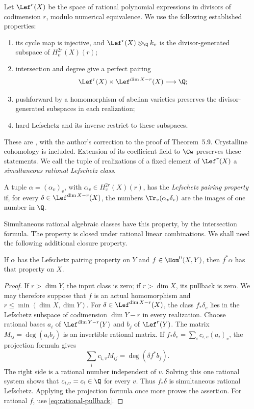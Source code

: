 Let \(\Lef^r(X)\) be the space of rational polynomial expressions in
divisors of codimension \(r\), modulo numerical equivalence. We use the
following established properties:
\begin{enumerate}[label=(\roman*)]
 \item its cycle map is injective, and
 \(\Lef^r(X)\otimes_\Q k_v\) is the divisor-generated subspace of
 \(H_v^{2r}(X)(r)\);
 \item intersection and degree give a perfect pairing
 \[
   \Lef^r(X)\times\Lef^{\dim X-r}(X)\longrightarrow\Q;
 \]
 \item pushforward by a homomorphism of abelian varieties preserves the
 divisor-generated subspaces in each realization;
 \item hard Lefschetz and its inverse restrict to these subspaces.
\end{enumerate}
These are \cite[Proposition~5.2, Corollaries~5.3 and~5.5,
Theorem~5.9]{Milne1999}, with the author's correction to the proof of
Theorem~5.9. Crystalline cohomology is included. Extension of its
coefficient field to \(\Cw\) preserves these statements. We call the
tuple of realizations of a fixed element of \(\Lef^r(X)\) a
\emph{simultaneous rational Lefschetz class}.

\begin{definition}
A tuple \(\alpha=(\alpha_v)_v\), with
\(\alpha_v\in H_v^{2r}(X)(r)\), has the \emph{Lefschetz pairing
property} if, for every \(\delta\in\Lef^{\dim X-r}(X)\), the numbers
\(\Tr_v(\alpha_v\delta_v)\) are the images of one number in \(\Q\).
\end{definition}

Simultaneous rational algebraic classes have this property, by the
intersection formula. The property is closed under rational linear
combinations. We shall need the following additional closure property.

\begin{lemma}\label{lem:pairing-functorial}
If \(\alpha\) has the Lefschetz pairing property on \(Y\) and
\(f\in\Hom^0(X,Y)\), then \(f^*\alpha\) has that property on \(X\).
\end{lemma}

\begin{proof}
If \(r>\dim Y\), the input class is zero; if \(r>\dim X\),
its pullback is zero. We may therefore suppose that \(f\) is an actual
homomorphism and \(r\leq\min(\dim X,\dim Y)\).
For \(\delta\in\Lef^{\dim X-r}(X)\), the class \(f_*\delta_v\)
lies in the Lefschetz subspace of codimension \(\dim Y-r\) in every
realization. Choose rational bases \(a_i\) of
\(\Lef^{\dim Y-r}(Y)\) and \(b_j\) of \(\Lef^r(Y)\). The matrix
\(M_{ij}=\deg(a_i b_j)\) is an invertible rational matrix. If
\(f_*\delta_v=\sum_i c_{i,v}(a_i)_v\), the projection formula gives
\[
 \sum_i c_{i,v}M_{ij}=\deg(\delta f^*b_j).
\]
The right side is a rational number independent of \(v\). Solving this
one rational system shows that \(c_{i,v}=c_i\in\Q\) for every \(v\).
Thus \(f_*\delta\) is simultaneous rational Lefschetz. Applying the
projection formula once more proves the assertion. For rational \(f\),
use \eqref{eq:rational-pullback}.
\end{proof}

